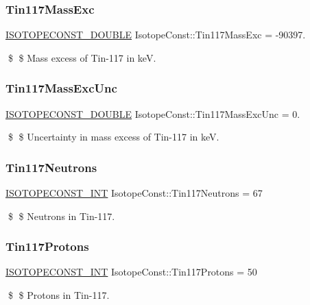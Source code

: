 \subsubsection{\texorpdfstring{Tin117\+Mass\+Exc}{Tin117MassExc}}
{\footnotesize\ttfamily \mbox{\hyperlink{group___isotope_const-_macros_ga8f45a7272ce02c0b4c65c44636ed719a}{I\+S\+O\+T\+O\+P\+E\+C\+O\+N\+S\+T\+\_\+\+D\+O\+U\+B\+LE}} Isotope\+Const\+::\+Tin117\+Mass\+Exc = -\/90397.}

\$ \$ Mass excess of Tin-\/117 in keV. \mbox{\label{group___isotope_const-_tin-_sn117_ga433a6bbe948468bb96fb8962a3201fad}} 
\subsubsection{\texorpdfstring{Tin117\+Mass\+Exc\+Unc}{Tin117MassExcUnc}}
{\footnotesize\ttfamily \mbox{\hyperlink{group___isotope_const-_macros_ga8f45a7272ce02c0b4c65c44636ed719a}{I\+S\+O\+T\+O\+P\+E\+C\+O\+N\+S\+T\+\_\+\+D\+O\+U\+B\+LE}} Isotope\+Const\+::\+Tin117\+Mass\+Exc\+Unc = 0.}

\$ \$ Uncertainty in mass excess of Tin-\/117 in keV. \mbox{\label{group___isotope_const-_tin-_sn117_ga96d4831cfe6ace843e460f03c91c4f37}} 
\subsubsection{\texorpdfstring{Tin117\+Neutrons}{Tin117Neutrons}}
{\footnotesize\ttfamily \mbox{\hyperlink{group___isotope_const-_macros_ga5f18360b3e99483a35c32d789e62621c}{I\+S\+O\+T\+O\+P\+E\+C\+O\+N\+S\+T\+\_\+\+I\+NT}} Isotope\+Const\+::\+Tin117\+Neutrons = 67}

\$ \$ Neutrons in Tin-\/117. \mbox{\label{group___isotope_const-_tin-_sn117_ga60e1af901ebc8217782279586a952d74}} 
\subsubsection{\texorpdfstring{Tin117\+Protons}{Tin117Protons}}
{\footnotesize\ttfamily \mbox{\hyperlink{group___isotope_const-_macros_ga5f18360b3e99483a35c32d789e62621c}{I\+S\+O\+T\+O\+P\+E\+C\+O\+N\+S\+T\+\_\+\+I\+NT}} Isotope\+Const\+::\+Tin117\+Protons = 50}

\$ \$ Protons in Tin-\/117. 